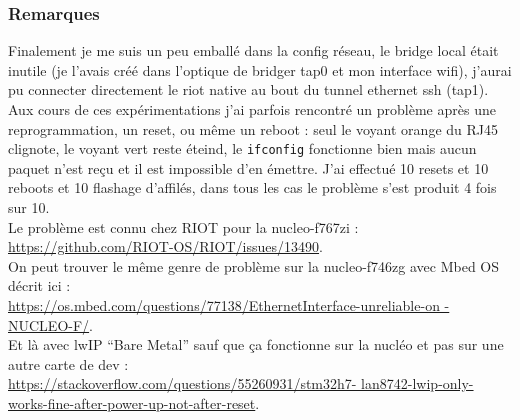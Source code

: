 \subsubsection{Remarques}
Finalement je me suis un peu emballé dans la config réseau, le bridge
local était inutile (je l'avais créé dans l'optique de bridger tap0 et
mon interface wifi), j'aurai pu connecter directement le riot native au
bout du tunnel ethernet ssh (tap1).\\

Aux cours de ces expérimentations j'ai parfois rencontré un problème
après une reprogrammation, un reset, ou même un reboot : seul le voyant
orange du RJ45 clignote, le voyant vert reste éteind, le
\texttt{ifconfig} fonctionne bien mais aucun paquet n'est reçu et il est
impossible d'en émettre. J'ai effectué 10 resets et 10 reboots et 10
flashage d'affilés, dans tous les cas le problème s'est produit 4 fois
sur 10.\\

Le problème est connu chez RIOT pour la nucleo-f767zi :\\
\url{https://github.com/RIOT-OS/RIOT/issues/13490}.\\

On peut trouver le même genre de problème sur la nucleo-f746zg avec Mbed
OS décrit ici :\\
\url{https://os.mbed.com/questions/77138/EthernetInterface-unreliable-on
-NUCLEO-F/}.\\

Et là avec lwIP \enquote{Bare Metal} sauf que ça fonctionne sur la
nucléo et pas sur une autre carte de dev :\\
{\scriptsize\url{https://stackoverflow.com/questions/55260931/stm32h7-
lan8742-lwip-only-works-fine-after-power-up-not-after-reset}}.
